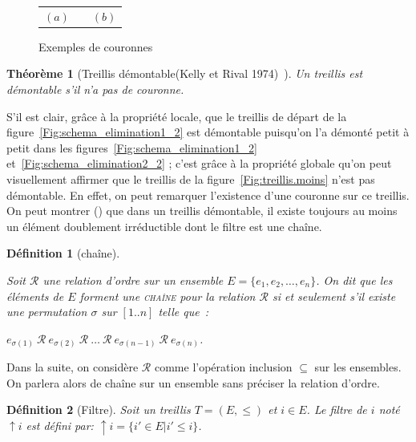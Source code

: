 \documentclass[a4paper]{report}
\newtheorem{definition}{Définition}[chapter]
\newtheorem{theorem}{Théorème}[chapter]
\begin{document}
\begin{figure}
\begin{center}
\begin{tabular}{c p{0.5cm} c}
 \\
    $(a)$   & & $(b)$   \\
\end{tabular}

\end{center}
\caption{Exemples de couronnes}
\label{fig:crown}
\end{figure}

\begin{theorem}[Treillis démontable(Kelly et Rival 1974)~\cite{kelly-rival74}]

\label{treillisdemontable}
Un treillis est démontable s'il n'a pas de couronne.
\end{theorem}


S'il est clair, grâce à la propriété locale, que le treillis de départ de la figure~\ref{Fig:schema_elimination1_2} est démontable puisqu'on l'a démonté 
petit à petit dans les figures~\ref{Fig:schema_elimination1_2} et~\ref{Fig:schema_elimination2_2} ; c'est grâce à la propriété globale qu'on peut visuellement affirmer que le 
treillis de la figure~\ref{Fig:treillis.moins} n'est pas démontable. En effet, on peut remarquer l'existence d'une couronne sur ce treillis.
On peut montrer (\cite{crow_free}) que dans un treillis démontable, il existe toujours au moins un élément 
doublement irréductible dont le filtre est une cha\^ine.

\begin{definition}[cha\^ine]

\label{chaine}

Soit $\mathcal{R}$ une relation d'ordre sur un ensemble $E = \{e_1, e_2, \hdots ,e_n\}$.
On dit que les éléments de $E$ forment une \textsc{cha\^ine} pour la relation $\mathcal{R}$ si et seulement s'il existe une permutation $\sigma$ sur $[1..n]$
 telle que~:

$e_{\sigma(1)}~\mathcal{R}~e_{\sigma(2)}~\mathcal{R}~\hdots~\mathcal{R}~e_{\sigma(n-1)}~\mathcal{R}~e_{\sigma(n)}$.
\end{definition}

Dans la suite, on considère $\mathcal{R}$ comme l'opération inclusion $\subseteq$ sur les ensembles. On parlera alors de cha\^ine sur un ensemble sans 
préciser la relation d'ordre.

\begin{definition}[Filtre]

\label{filtre}
Soit un treillis $T = (E, \leq)$ et $i \in E$. Le filtre de $i$ noté $\uparrow i$ est défini par: $\uparrow i =\{i' \in E | i' \leq i \}$.
\end{definition}
\end{document}
